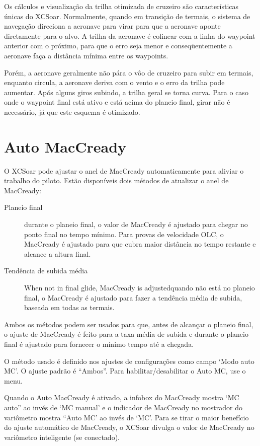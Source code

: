Os cálculos e visualização da trilha otimizada de cruzeiro são características únicas do XCSoar.  Normalmente, quando em transição de termais, o sistema de navegação direciona a aeronave para virar para que a aeronave aponte diretamente para o alvo.  A trilha da aeronave é colinear com a linha do waypoint anterior com o próximo, para que o erro seja menor e conseqüentemente a aeronave faça a distância mínima entre os waypoints.

Porém, a aeronave geralmente não pára o vôo de cruzeiro para subir em termais, enquanto circula, a aeronave deriva com o vento e o erro da trilha pode aumentar.  Após alguns giros subindo, a trilha geral se torna curva. 
%
Para o caso onde o waypoint final está ativo e está acima do planeio final, girar não é necessário, já que este esquema é otimizado.


\section{Auto MacCready}\label{sec:auto-maccready}

O XCSoar pode ajustar o anel de MacCready automaticamente para aliviar o trabalho do piloto.  Estão disponíveis dois métodos de atualizar o anel de MacCready:
\begin{description}
\item[Planeio final]  durante o planeio final, o valor de MacCready é ajustado para chegar no ponto final no tempo mínimo.  Para provas de velocidade OLC, o MacCready é ajustado para que cubra maior distância no tempo restante e alcance a altura final.
\item[Tendência de subida média] When not in final glide, MacCready is adjustedquando não está no planeio final, o MacCready é ajustado para fazer a tendência média de subida, baseada em todas as termais.
\end{description}
Ambos os métodos podem ser usados para que, antes de alcançar o planeio final, o ajuste de MacCready é feito para a taxa média de subida e durante o planeio final é ajustado para fornecer o mínimo tempo até a chegada.

O método usado é definido nos ajustes de configurações como campo ‘Modo auto MC’.  O ajuste padrão é “Ambos”.  Para habilitar/desabilitar o Auto MC, use o menu.  


Quando o Auto MacCready é ativado, a infobox do MacCready mostra ‘MC auto” ao invés de ‘MC manual’ e o indicador de MacCready no mostrador do variômetro mostra “Auto MC’ ao invés de ‘MC’.  Para se tirar o maior benefício do ajuste automático de MacCready, o XCSoar divulga o valor de MacCready no variômetro inteligente (se conectado).

